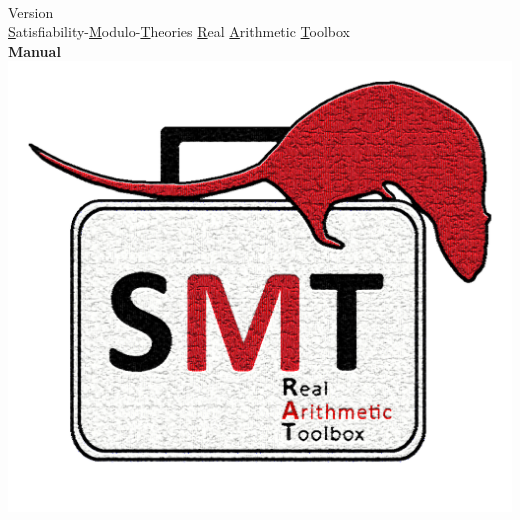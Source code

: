 \begin{titlepage}
	\begin{center}
		\Huge{\textbf{\TITLE}}\\
		\Huge{Version \VERSION}\vspace{1cm}\\
		\Large \underline{S}atisfiability-\underline{M}odulo-\underline{T}heories \underline{R}eal \underline{A}rithmetic \underline{T}oolbox\vspace{1cm}\\
		\Huge{\textbf{Manual}}
		\vspace{2cm}\\
		\includegraphics[scale=0.3]{graphics/logo}
	\end{center}
\end{titlepage}
